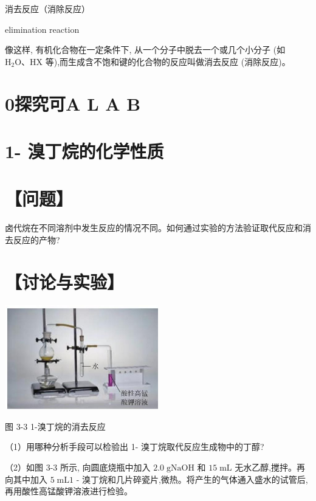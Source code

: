 \documentclass[10pt]{article}
\begin{document}
\begin{mdframed}

消去反应（消除反应）

elimination reaction

\end{mdframed}

像这样, 有机化合物在一定条件下, 从一个分子中脱去一个或几个小分子 (如 \({\mathrm{H}}_{2}\mathrm{O}\text{、}\mathrm{{HX}}\) 等),而生成含不饱和键的化合物的反应叫做消去反应 (消除反应)。

\section*{0探究可A L A B}

\section*{1- 溴丁烷的化学性质}

\section*{【问题】}

卤代烷在不同溶剂中发生反应的情况不同。如何通过实验的方法验证取代反应和消去反应的产物?

\section*{【讨论与实验】}

\begin{center}
\includegraphics[max width=0.5\textwidth]{images/0190efc5-b58a-7c43-bfb0-e0a030df9cfd_61_233059.jpg}
\end{center}

图 3-3 1-溴丁烷的消去反应

（1）用哪种分析手段可以检验出 1- 溴丁烷取代反应生成物中的丁醇?

（2）如图 3-3 所示, 向圆底烧瓶中加入 \({2.0}\mathrm{\;g}\mathrm{{NaOH}}\) 和 \({15}\mathrm{\;{mL}}\) 无水乙醇,搅拌。再向其中加入 \(5\mathrm{\;{mL}}1\) - 溴丁烷和几片碎瓷片,微热。将产生的气体通入盛水的试管后, 再用酸性高锰酸钾溶液进行检验。
\end{document}
